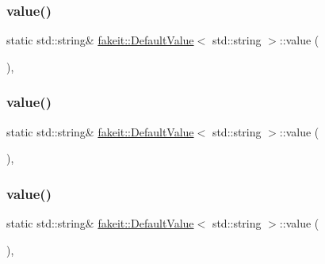 \subsubsection{\texorpdfstring{value()}{value()}\hspace{0.1cm}{\footnotesize\ttfamily [3/9]}}
{\footnotesize\ttfamily static std\+::string\& \mbox{\hyperlink{structfakeit_1_1DefaultValue}{fakeit\+::\+Default\+Value}}$<$ std\+::string $>$\+::value (\begin{DoxyParamCaption}{ }\end{DoxyParamCaption})\hspace{0.3cm}{\ttfamily [inline]}, {\ttfamily [static]}}

\mbox{\label{structfakeit_1_1DefaultValue_3_01std_1_1string_01_4_a01ff9f569a285bde4c2acd3ece6639f7}} 
\subsubsection{\texorpdfstring{value()}{value()}\hspace{0.1cm}{\footnotesize\ttfamily [4/9]}}
{\footnotesize\ttfamily static std\+::string\& \mbox{\hyperlink{structfakeit_1_1DefaultValue}{fakeit\+::\+Default\+Value}}$<$ std\+::string $>$\+::value (\begin{DoxyParamCaption}{ }\end{DoxyParamCaption})\hspace{0.3cm}{\ttfamily [inline]}, {\ttfamily [static]}}

\mbox{\label{structfakeit_1_1DefaultValue_3_01std_1_1string_01_4_a01ff9f569a285bde4c2acd3ece6639f7}} 
\subsubsection{\texorpdfstring{value()}{value()}\hspace{0.1cm}{\footnotesize\ttfamily [5/9]}}
{\footnotesize\ttfamily static std\+::string\& \mbox{\hyperlink{structfakeit_1_1DefaultValue}{fakeit\+::\+Default\+Value}}$<$ std\+::string $>$\+::value (\begin{DoxyParamCaption}{ }\end{DoxyParamCaption})\hspace{0.3cm}{\ttfamily [inline]}, {\ttfamily [static]}}

